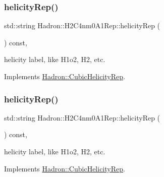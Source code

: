 \mbox{\label{structHadron_1_1H2C4nm0A1Rep_a68f777d04db52d25c21b65d117a9fe71}} 
\subsubsection{\texorpdfstring{helicityRep()}{helicityRep()}\hspace{0.1cm}{\footnotesize\ttfamily [1/2]}}
{\footnotesize\ttfamily std\+::string Hadron\+::\+H2\+C4nm0\+A1\+Rep\+::helicity\+Rep (\begin{DoxyParamCaption}{ }\end{DoxyParamCaption}) const\hspace{0.3cm}{\ttfamily [inline]}, {\ttfamily [virtual]}}

helicity label, like H1o2, H2, etc. 

Implements \mbox{\hyperlink{structHadron_1_1CubicHelicityRep_af1096946b7470edf0a55451cc662f231}{Hadron\+::\+Cubic\+Helicity\+Rep}}.

\mbox{\label{structHadron_1_1H2C4nm0A1Rep_a68f777d04db52d25c21b65d117a9fe71}} 
\subsubsection{\texorpdfstring{helicityRep()}{helicityRep()}\hspace{0.1cm}{\footnotesize\ttfamily [2/2]}}
{\footnotesize\ttfamily std\+::string Hadron\+::\+H2\+C4nm0\+A1\+Rep\+::helicity\+Rep (\begin{DoxyParamCaption}{ }\end{DoxyParamCaption}) const\hspace{0.3cm}{\ttfamily [inline]}, {\ttfamily [virtual]}}

helicity label, like H1o2, H2, etc. 

Implements \mbox{\hyperlink{structHadron_1_1CubicHelicityRep_af1096946b7470edf0a55451cc662f231}{Hadron\+::\+Cubic\+Helicity\+Rep}}.

\mbox{\label{structHadron_1_1H2C4nm0A1Rep_af78536d0069f367b69654854815b015d}} 
